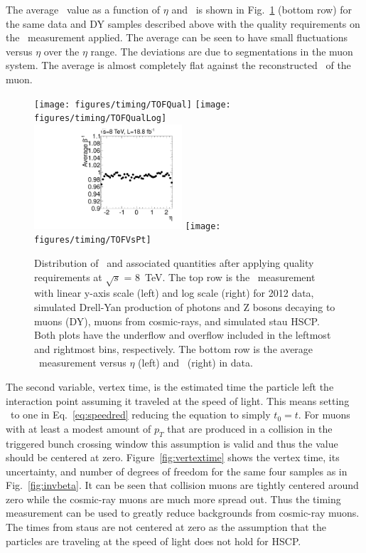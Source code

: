 The average \invbeta\ value as a function of $\eta$ and \pt\ is shown in Fig.~\ref{fig:invbetaQual} (bottom row) for the same data and DY samples described above
with the quality requirements on the \invbeta\ measurement applied.
The average can be seen to have small fluctuations versus $\eta$ over the $\eta$ range.
The deviations are due to segmentations in the muon system.
The average is almost completely flat against the reconstructed \pt\ of the muon.

\begin{figure}
  \begin{center}
      \texttt{[image: figures/timing/TOFQual]}
      \texttt{[image: figures/timing/TOFQualLog]} \\
      \includegraphics[width=0.49\textwidth]{figures/timing/TOFVsEta}
      \texttt{[image: figures/timing/TOFVsPt]} \\
      \caption[Distribution of \invbeta\ and associated quantities after applying quality requirements.]
      {Distribution of \invbeta\ and associated quantities after applying quality requirements at $\sqrt{s}$ = 8~TeV. 
The top row is the \invbeta\ measurement with linear y-axis scale (left) and log scale (right) for 2012 data,
simulated Drell-Yan production of photons and Z bosons decaying to muons (DY), muons from cosmic-rays, and simulated stau HSCP.
Both plots have the underflow and overflow included in the leftmost and rightmost bins, respectively.
The bottom row is the average \invbeta\ measurement versus $\eta$ (left) and \pt\ (right) in data.
        }
      \label{fig:invbetaQual}
  \end{center}
\end{figure}

The second variable, vertex time, is the estimated time the particle 
left the interaction point assuming it traveled at the speed of light.
This means setting \invbeta\ to one in Eq.~\ref{eq:speedred} reducing the equation to simply $t_0 = t$. 
For muons with at least a modest amount of $p_T$ that are produced in a collision in the triggered bunch crossing window this assumption is valid and thus the
value should be centered at zero. Figure~\ref{fig:vertextime} shows the vertex time, its uncertainty, and number of degrees of freedom
for the same four samples as in Fig.~\ref{fig:invbeta}. It can be seen that collision muons are tightly centered around zero while the cosmic-ray muons
are much more spread out.  Thus the timing measurement can be used to greatly reduce backgrounds from cosmic-ray muons. The times from staus are not centered
at zero as the assumption that the particles are traveling at the speed of light does not hold for HSCP.

